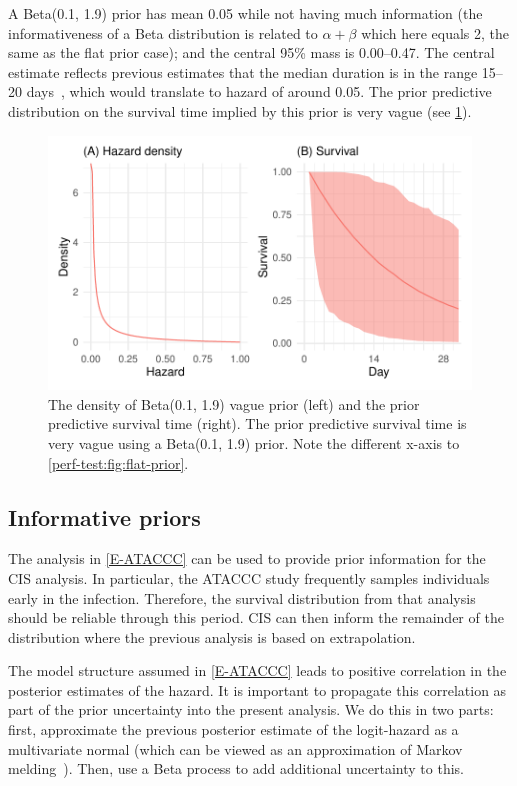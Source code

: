 \documentclass[thesis.tex]{subfiles}
\begin{document}
A Beta(0.1, 1.9) prior has mean 0.05 while not having much information (the informativeness of a Beta distribution is related to $\alpha + \beta$ which here equals 2, the same as the flat prior case); and the central 95\% mass is 0.00--0.47.
The central estimate reflects previous estimates that the median duration is in the range 15--20 days~\autocite{cevikShedding}, which would translate to hazard of around 0.05.
The prior predictive distribution on the survival time implied by this prior is very vague (see \cref{perf-test:fig:vague-prior}).
\begin{figure}
  \centering \includegraphics{cis-perfect-testing/vague-prior}
  \caption[Weakly informative priors for the hazard]{The density of Beta(0.1, 1.9) vague prior (left) and the prior predictive survival time (right). The prior predictive survival time is very vague using a Beta(0.1, 1.9) prior. Note the different x-axis to \cref{perf-test:fig:flat-prior}. \label{perf-test:fig:vague-prior}}
\end{figure}

\subsection{Informative priors}

The analysis in \cref{E-ATACCC} can be used to provide prior information for the CIS analysis.
In particular, the ATACCC study frequently samples individuals early in the infection.
Therefore, the survival distribution from that analysis should be reliable through this period.
CIS can then inform the remainder of the distribution where the previous analysis is based on extrapolation.

The model structure assumed in \cref{E-ATACCC} leads to positive correlation in the posterior estimates of the hazard.
It is important to propagate this correlation as part of the prior uncertainty into the present analysis.
We do this in two parts: first, approximate the previous posterior estimate of the logit-hazard as a multivariate normal (which can be viewed as an approximation of Markov melding~\autocite{goudieJoining}).
Then, use a Beta process to add additional uncertainty to this.
\end{document}
